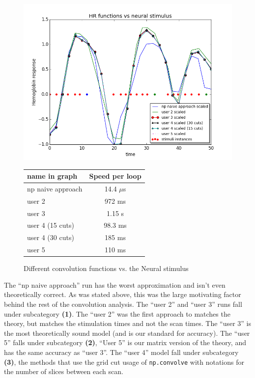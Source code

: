 \begin{figure}[ht]
\centering
	\begin{minipage}[b]{0.45\linewidth}
		\centering
		\includegraphics[width=.8\linewidth]{../images/convolution_vs_neural_stimulus}  
		\caption{\scriptsize{Different convolution functions vs. the Neural stimulus}}
		\label{fig:convolution}

	\end{minipage}
\quad
	\begin{minipage}[b]{0.45\linewidth}
		\centering
		\begin{tabular}{|l | c|}
		\hline
		name in graph       & Speed per loop \\
		\hline
		np naive approach & 14.4 $\mu$s  \\
		user 2     		    & 972 ms  \\
		user 3     		    & 1.15 s    \\
		user 4 (15 cuts)      & 98.3 ms \\
		user 4 (30 cuts)      & 185 ms  \\
		user 5     	 	    & 110 ms   \\
		\hline
		\end{tabular}
		\vspace{5mm}
		\label{tab:convolution}
	\end{minipage}
\end{figure}

The ``np naive approach'' run has the worst approximation and isn't even 
theoretically correct. As was stated above, this was the large motivating factor 
behind the rest of the convolution analysis. The ``user 2'' and ``user 3'' runs fall 
under subcategory \textbf{(1)}. The ``user 2'' was the first approach to
matches the theory, but matches the stimulation times and not the scan times.
The ``user 3'' is the most theoretically sound model (and is our standard for 
accuracy). The ``user 5'' falls under subcategory \textbf{(2)}, ``User 5''  is our 
matrix version of the theory, and has the same accuracy as ``user 3''. The 
``user 4'' model fall under subcategory \textbf{(3)}, the methods that use the 
grid cut usage of \texttt{np.convolve} with notations for the number of slices 
between each scan.

